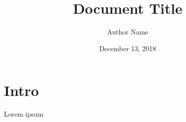 \documentclass{article}
\title{Document Title}
\author{Author Name}
\date{December 13, 2018}
\begin{document}
\maketitle

\section{Intro}

Lorem ipsum
\end{document}
